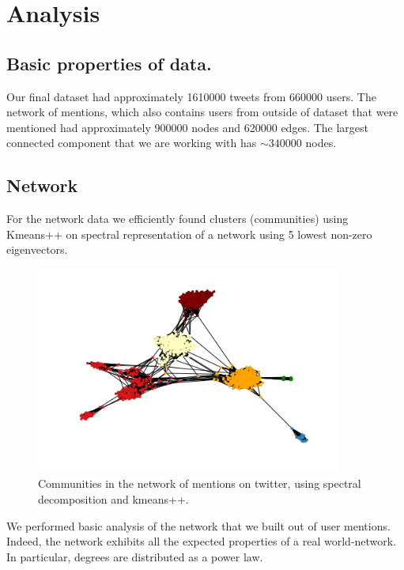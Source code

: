 \documentclass[%
 reprint,
 amsmath,amssymb,
 aps,
]{revtex4-1}
\begin{document}
\section{Analysis}

\subsection{Basic properties of data.}

Our final dataset had approximately 1610000 tweets from 660000 users. The network of mentions, which also contains users from outside of dataset that were mentioned had approximately 900000 nodes and 620000 edges. The largest connected component that we are working with has $\sim 340000$ nodes.



\subsection{Network}

For the network data we efficiently found clusters (communities) using Kmeans++ on spectral representation of a network using 5 lowest non-zero eigenvectors.

\begin{figure}[htp]
\centering
\includegraphics[width=10cm]{communities}
\caption{Communities in the network of mentions on twitter, using spectral decomposition and kmeans++.}
\label{fig}
\end{figure}


We performed basic analysis of the network that we built out of user mentions. Indeed, the network exhibits all the expected properties of a real world-network. In particular, degrees are distributed as a power law.
\end{document}
